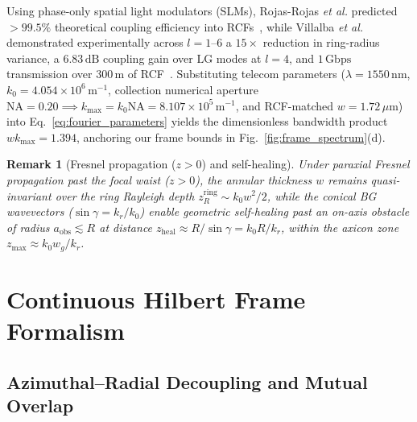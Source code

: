 \documentclass[aps,pra,onecolumn,notitlepage,11pt,tightenlines,amsmath,amssymb,floatfix,longbibliography]{revtex4-2}
\newtheorem{remark}{Remark}
\begin{document}
Using phase-only spatial light modulators (SLMs), Rojas-Rojas \emph{et al.} predicted $>99.5\%$ theoretical coupling efficiency into RCFs~\cite{RojasRojas2021}, while Villalba \emph{et al.} demonstrated experimentally across $l=1\text{--}6$ a $15\times$ reduction in ring-radius variance, a $6.83\,\mathrm{dB}$ coupling gain over $\mathrm{LG}$ modes at $l=4$, and $1\,\mathrm{Gbps}$ transmission over $300\,\mathrm{m}$ of RCF~\cite{Villalba2023}. Substituting telecom parameters ($\lambda = 1550\,\mathrm{nm}$, $k_0 = 4.054\times 10^6\,\mathrm{m}^{-1}$, collection numerical aperture $\mathrm{NA} = 0.20 \implies k_{\max} = k_0 \mathrm{NA} = 8.107\times 10^5\,\mathrm{m}^{-1}$, and RCF-matched $w = 1.72\,\mu\mathrm{m}$) into Eq.~\eqref{eq:fourier_parameters} yields the dimensionless bandwidth product $w k_{\max} = 1.394$, anchoring our frame bounds in Fig.~\ref{fig:frame_spectrum}(d).

\begin{remark}[Fresnel propagation (\texorpdfstring{$z>0$}{z > 0}) and self-healing]
\label{rem:propagation}
Under paraxial Fresnel propagation past the focal waist ($z>0$), the annular thickness $w$ remains quasi-invariant over the ring Rayleigh depth $z_R^{\mathrm{ring}} \sim k_0 w^2/2$, while the conical BG wavevectors ($\sin\gamma = k_r/k_0$) enable geometric self-healing past an on-axis obstacle of radius $a_{\mathrm{obs}} \lesssim R$ at distance $z_{\mathrm{heal}} \approx R/\sin\gamma = k_0 R/k_r$, within the axicon zone $z_{\max} \approx k_0 w_g/k_r$.
\end{remark}

\section{Continuous Hilbert Frame Formalism}
\label{sec:frame_formalism}

\subsection{Azimuthal--Radial Decoupling and Mutual Overlap}
\label{subsec:overlap_kernel}
\end{document}
